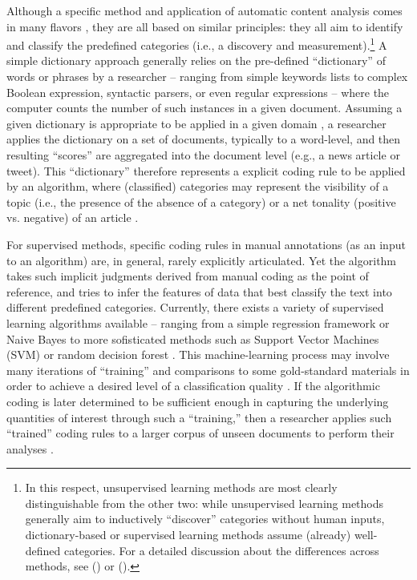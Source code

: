 \documentclass[man, 12pt, a4paper, nolmodern, noextraspace]{apa6}
\begin{document}
    Although a specific method and application of automatic content analysis comes in many flavors \parencites[for a broad overview, see:][]{Boumans_Trilling_2016, grimmer2013text}, they are all based on similar principles: they all aim to identify and classify the predefined categories (i.e., a discovery and measurement).\footnote{In this respect, unsupervised learning methods are most clearly distinguishable from the other two: while unsupervised learning methods generally aim to inductively \enquote{discover} categories without human inputs, dictionary-based or supervised learning methods assume (already) well-defined categories. For a detailed discussion about the differences across methods, see \citeauthor{grimmer2013text} (\citeyear{grimmer2013text}) or \citeauthor{Boumans_Trilling_2016} (\citeyear{Boumans_Trilling_2016}).} A simple dictionary approach generally relies on the pre-defined “dictionary” of words or phrases by a researcher -- ranging from simple keywords lists to complex Boolean expression, syntactic parsers, or even regular expressions -- where the computer counts the number of such instances in a given document. Assuming a given dictionary is appropriate to be applied in a given domain \parencite{Boumans_Trilling_2016, gonzalez2015signals}, a researcher applies the dictionary on a set of documents, typically to a word-level, and then resulting \enquote{scores} are aggregated into the document level (e.g., a news article or tweet). This \enquote{dictionary} therefore represents a explicit coding rule to be applied by an algorithm, where (classified) categories may represent the visibility of a topic (i.e., the presence of the absence of a category) or a net tonality (positive vs. negative) of an article \parencites[e.g.,][]{Aaldering2016, YoungSoroka2012, boomgaaden2009, gonzalez2015signals, Rooduijn2011}. 
    
    For supervised methods, specific coding rules in manual annotations (as an input to an algorithm) are, in general, rarely explicitly articulated. Yet the algorithm takes such implicit judgments derived from manual coding as the point of reference, and tries to infer the features of data that best classify the text into different predefined categories. Currently, there exists a variety of supervised learning algorithms available -- ranging from a simple regression framework or Naive Bayes to more sofisticated methods such as Support Vector Machines (SVM) or random decision forest \parencites[for an overview of different algorithms commonly used in social science applications, see][]{hindman2015building}. This machine-learning process may involve many iterations of \enquote{training} and comparisons to some gold-standard materials in order to achieve a desired level of a classification quality \parencites[e.g.,][]{scharkow2013thematic}. If the algorithmic coding is later determined to be sufficient enough in capturing the underlying quantities of interest through such a \enquote{training,} then a researcher applies such \enquote{trained} coding rules to a larger corpus of unseen documents to perform their analyses \parencites[e.g.,][]{Wouter2008News, burscher2015using, burscher2014teaching, scharkow2013thematic, gonzalez2015signals}.    
    
\end{document}

